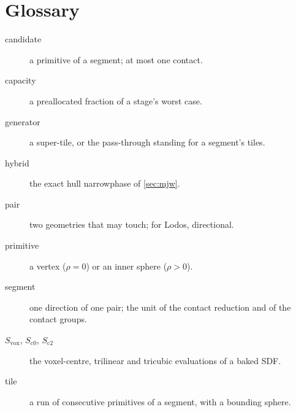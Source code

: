 \section{Glossary}\label{app:glossary}

\begin{description}
\item[candidate] a primitive of a segment; at most one contact.
\item[capacity] a preallocated fraction of a stage's worst case.
\item[generator] a super-tile, or the pass-through standing for a segment's tiles.
\item[hybrid] the exact hull narrowphase of \cref{sec:mjw}.
\item[pair] two geometries that may touch; for Lodos, directional.
\item[primitive] a vertex ($\rho = 0$) or an inner sphere ($\rho > 0$).
\item[segment] one direction of one pair; the unit of the contact reduction and of the contact groups.
\item[$S_{\mathrm{vox}}$, $S_{\mathrm{c0}}$, $S_{\mathrm{c2}}$] the voxel-centre, trilinear and tricubic evaluations of a baked SDF.
\item[tile] a run of  consecutive primitives of a segment, with a bounding sphere.
\end{description}

